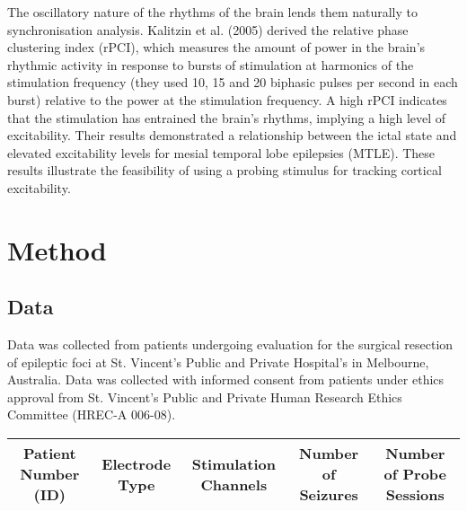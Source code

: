 \documentclass[]{article}
\begin{document}
The oscillatory nature of the rhythms of the brain lends them naturally to synchronisation analysis. 
Kalitzin et al. (2005) derived the relative phase clustering index (rPCI), which measures the amount of power in the brain’s rhythmic activity in response to bursts of stimulation at harmonics of the stimulation frequency (they used 10, 15 and 20 biphasic pulses per second in each burst) relative to the power at the stimulation frequency. A high rPCI indicates that the stimulation has entrained the brain’s rhythms, implying a high level of excitability. Their results demonstrated a relationship between the ictal state and elevated excitability levels for mesial temporal lobe epilepsies (MTLE). These results illustrate the feasibility of using a probing stimulus for tracking cortical excitability.

\section{Method}

\subsection{Data}
Data was collected from patients undergoing  evaluation for the surgical resection of epileptic foci at St. Vincent's Public and Private Hospital's in Melbourne, Australia. Data was collected with informed consent from patients under ethics approval from St. Vincent's Public and Private Human Research Ethics Committee (HREC-A 006-08).

\begin{tabular}{c|c|c|c|c} \hline
\textbf{Patient Number (ID)} & \textbf{Electrode Type} & \textbf{Stimulation Channels} & \textbf{Number of Seizures} & Number of Probe Sessions\\ \hline
\end{tabular}




\end{document}
